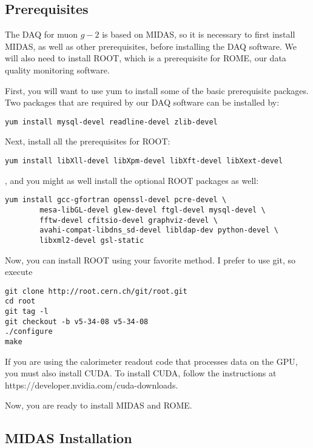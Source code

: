\subsection{Prerequisites}
The DAQ for muon $g-2$ is based on MIDAS, so it is necessary to first install MIDAS, as well as other prerequisites, before installing the DAQ software. We will also need to install ROOT, which is a prerequisite for ROME, our data quality monitoring software.

First, you will want to use yum to install some of the basic prerequisite packages. Two packages that are required by our DAQ software can be installed by:

\begin{verbatim}
yum install mysql-devel readline-devel zlib-devel
\end{verbatim}

Next, install all the prerequisites for ROOT:

\begin{verbatim}
yum install libXll-devel libXpm-devel libXft-devel libXext-devel
\end{verbatim}

, and you might as well install the optional ROOT packages as well:

\begin{verbatim}
yum install gcc-gfortran openssl-devel pcre-devel \
        mesa-libGL-devel glew-devel ftgl-devel mysql-devel \
        fftw-devel cfitsio-devel graphviz-devel \
        avahi-compat-libdns_sd-devel libldap-dev python-devel \
        libxml2-devel gsl-static
\end{verbatim}

Now, you can install ROOT using your favorite method. I prefer to use git, so execute

\begin{verbatim}
git clone http://root.cern.ch/git/root.git
cd root
git tag -l
git checkout -b v5-34-08 v5-34-08
./configure
make
\end{verbatim}

If you are using the calorimeter readout code that processes data on the GPU, you must also install CUDA. To install CUDA, follow the instructions at https://developer.nvidia.com/cuda-downloads.

Now, you are ready to install MIDAS and ROME.


\subsection{MIDAS Installation}

